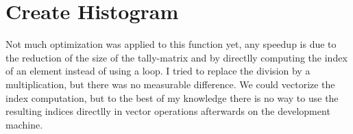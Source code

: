 \section{Create Histogram}
Not much optimization was applied to this function yet, any speedup is due to the reduction of the size of the tally-matrix and by directlly computing the
index of an element instead of using a loop. I tried to replace the division by a multiplication, but there was no measurable difference. We could vectorize the index
computation, but to the best of my knowledge there is no way to use the resulting indices directlly in vector operations afterwards on the development machine.


